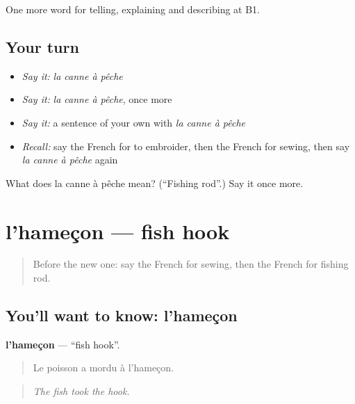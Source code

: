 \begin{grammarlens}[title={What you've built}]
One more word for telling, explaining and describing at B1.
\end{grammarlens}

\subsection*{Your turn}
\begin{itemize}
\raggedright
  \item \emph{Say it:} \emph{la canne à pêche}
  \item \emph{Say it:} \emph{la canne à pêche}, once more
  \item \emph{Say it:} a sentence of your own with \emph{la canne à pêche}
  \item \emph{Recall:} say the French for to embroider, then the French for sewing, then say \emph{la canne à pêche} again
\end{itemize}

\begin{tcolorbox}[breakable,colback=teal!4,colframe=teal!35!black,title={Before you move on}]
What does la canne à pêche mean? (\textquotedblleft{}Fishing rod\textquotedblright{}.) Say it once more.
\end{tcolorbox}
\section[l'hameçon]{l'hameçon — fish hook}

\label{lesson:FR-C497-hamecon}



\begin{quote}
Before the new one: say the French for sewing, then the French for fishing rod.
\end{quote}

\subsection*{You'll want to know: l'hameçon}
\textbf{l'hameçon} — \textquotedblleft{}fish hook\textquotedblright{}.

\begin{quote}
Le poisson a mordu à l'hameçon.
\end{quote}

\begin{quote}
\emph{The fish took the hook.}
\end{quote}

